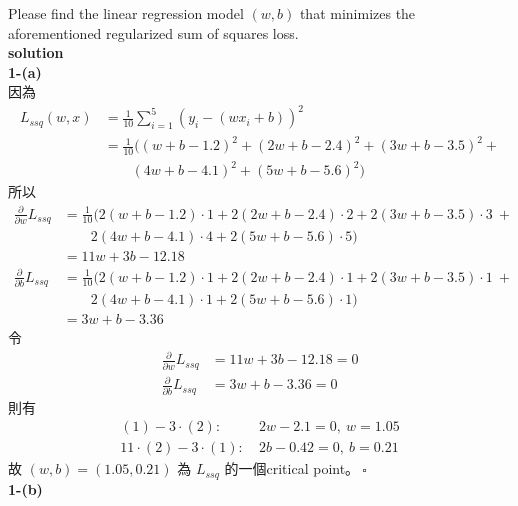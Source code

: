 \documentclass{article}
\begin{document}
Please find the linear regression model $(w, b)$ that minimizes the aforementioned regularized sum of squares loss.\\

\noindent
{\bf \large solution}\\

\noindent
{\bf 1-(a)}\\

\noindent
因為
\begin{align*}
    L_{ssq}(w, x) &= \frac{1}{10}\sum_{i = 1}^{5} (y_i - (wx_i + b))^2\\
    &= \frac{1}{10}((w + b - 1.2)^2 + (2w + b - 2.4)^2 + (3w + b - 3.5)^2 +\\
    &\ \ \ \ \ \ \ \ \ (4w + b - 4.1)^2 + (5w + b - 5.6)^2)
\end{align*}
所以
\begin{align*}
    \frac{\partial}{\partial w}L_{ssq} &= \frac{1}{10}(2(w + b - 1.2) \cdot 1 + 2(2w + b - 2.4) \cdot 2 + 2(3w + b - 3.5) \cdot 3\ +\\
    &\ \ \ \ \ \ \ \ \ 2(4w + b - 4.1) \cdot 4 + 2(5w + b - 5.6) \cdot 5)\\
    &= 11w + 3b - 12.18\\
    \frac{\partial}{\partial b}L_{ssq} &= \frac{1}{10}(2(w + b - 1.2) \cdot 1 + 2(2w + b - 2.4) \cdot 1 + 2(3w + b - 3.5) \cdot 1\ +\\
    &\ \ \ \ \ \ \ \ \ 2(4w + b - 4.1) \cdot 1 + 2(5w + b - 5.6) \cdot 1)\\
    &= 3w + b - 3.36
\end{align*}
令
\begin{align}
    \frac{\partial}{\partial w} L_{ssq} &= 11w + 3b - 12.18 = 0\\
    \frac{\partial}{\partial b} L_{ssq} &= 3w + b - 3.36 = 0
\end{align}
則有
\begin{align*}
    (1) - 3 \cdot (2) :\ &2w - 2.1 = 0,\ w = 1.05\\
    11 \cdot (2) - 3 \cdot (1) :\ &2b - 0.42 = 0,\ b = 0.21
\end{align*}
故 $(w, b) = (1.05, 0.21)$ 為 $L_{ssq}$ 的一個critical point。$\ \square$\\

\noindent
{\bf 1-(b)}\\
\end{document}

